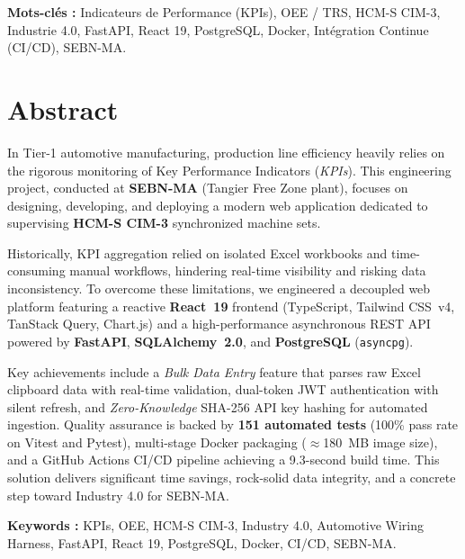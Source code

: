 \documentclass{report}
\begin{document}
\vspace{0.6cm}
\noindent \textbf{Mots-clés :} Indicateurs de Performance (KPIs), OEE / TRS, HCM-S CIM-3, Industrie 4.0, FastAPI, React 19, PostgreSQL, Docker, Intégration Continue (CI/CD), SEBN-MA.

\cleardoublepage
{}
\chapter*{Abstract}

In Tier-1 automotive manufacturing, production line efficiency heavily relies on the rigorous monitoring of Key Performance Indicators (\textit{KPIs}). This engineering project, conducted at \textbf{SEBN-MA} (Tangier Free Zone plant), focuses on designing, developing, and deploying a modern web application dedicated to supervising \textbf{HCM-S CIM-3} synchronized machine sets.

Historically, KPI aggregation relied on isolated Excel workbooks and time-consuming manual workflows, hindering real-time visibility and risking data inconsistency. To overcome these limitations, we engineered a decoupled web platform featuring a reactive \textbf{React~19} frontend (TypeScript, Tailwind CSS~v4, TanStack Query, Chart.js) and a high-performance asynchronous REST API powered by \textbf{FastAPI}, \textbf{SQLAlchemy~2.0}, and \textbf{PostgreSQL} (\texttt{asyncpg}).

Key achievements include a \textit{Bulk Data Entry} feature that parses raw Excel clipboard data with real-time validation, dual-token JWT authentication with silent refresh, and \textit{Zero-Knowledge} SHA-256 API key hashing for automated ingestion. Quality assurance is backed by \textbf{151 automated tests} (100\% pass rate on Vitest and Pytest), multi-stage Docker packaging ($\approx$180~MB image size), and a GitHub Actions CI/CD pipeline achieving a 9.3-second build time. This solution delivers significant time savings, rock-solid data integrity, and a concrete step toward Industry 4.0 for SEBN-MA.

\vspace{0.6cm}
\noindent \textbf{Keywords :} KPIs, OEE, HCM-S CIM-3, Industry 4.0, Automotive Wiring Harness, FastAPI, React 19, PostgreSQL, Docker, CI/CD, SEBN-MA.

\cleardoublepage
{}
\tableofcontents

\renewcommand{\listfigurename}{Liste des figures}

\cleardoublepage
{}
\addcontentsline{toc}{chapter}{\listfigurename}
\listoffigures

\cleardoublepage
{}
\setcounter{page}{1}







\end{document}
